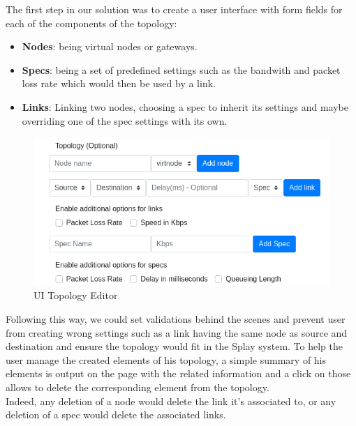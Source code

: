 \documentclass{eplmastersthesis}
\begin{document}
          The first step in our solution was to create a user interface with
          form fields for each of the components of the topology:

          \begin{itemize}
            \item \textbf{Nodes}: being virtual nodes or gateways.
            \item \textbf{Specs}: being a set of predefined settings such as the
            bandwith and packet loss rate which would then be used by
            a link.
            \item \textbf{Links}: Linking two nodes, choosing a spec to
            inherit its settings and maybe overriding one of the spec settings
            with its own.
          \end{itemize}

          \begin{figure}[H]
            \centering
            \includegraphics[scale=0.6]{figures/editor_topology.png}
            \caption{\label{editor_topology} UI Topology Editor}
          \end{figure}

          Following this way, we could set validations behind the scenes and
          prevent user from creating wrong settings such as a link having the
          same node as source and destination and ensure the topology would
          fit in the Splay system. To help the user manage the created
          elements of his topology, a simple summary of his elements is
          output on the page with the related information and a click on those
          allows to delete the corresponding element from the topology.\\
          Indeed, any deletion of a node would delete the link it's associated
          to, or any deletion of a spec would delete the associated links.\\
\end{document}
